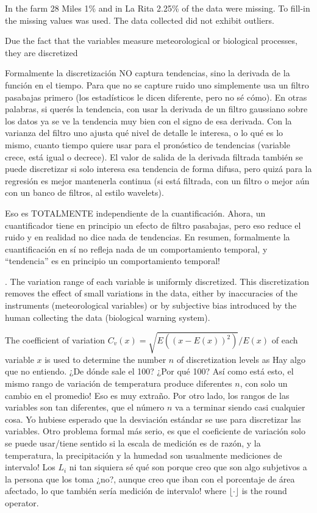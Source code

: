 In the farm 28 Miles 1\% and in La Rita 2.25\% of the data were missing.
%
To fill-in the missing values  was used.
%
The data collected did not exhibit outliers.

Due the fact that the variables measure meteorological or biological
processes, they are discretized %
%
{Formalmente la discretización NO captura tendencias, sino la derivada
  de la función en el tiempo.  Para que no se capture ruido uno
  simplemente usa un filtro pasabajas primero (los estadísticos le
  dicen diferente, pero no sé cómo).  En otras palabras, si querés la
  tendencia, con usar la derivada de un filtro gaussiano sobre los
  datos ya se ve la tendencia muy bien con el signo de esa derivada.
  Con la varianza del filtro uno ajusta qué nivel de detalle le
  interesa, o lo qué es lo mismo, cuanto tiempo quiere usar para el
  pronóstico de tendencias (variable crece, está igual o decrece).  El
  valor de salida de la derivada filtrada también se puede discretizar
  si solo interesa esa tendencia de forma difusa, pero quizá para la
  regresión es mejor mantenerla continua (si está filtrada, con un
  filtro o mejor aún con un banco de filtros, al estilo wavelets).

  Eso es TOTALMENTE independiente de la cuantificación.  Ahora, un
  cuantificador tiene en principio un efecto de filtro pasabajas, pero
  eso reduce el ruido y en realidad no dice nada de tendencias.  En
  resumen, formalmente la cuantificación en sí no refleja nada de un
  comportamiento temporal, y ``tendencia'' es en principio un
  comportamiento temporal!}.
%
The variation range of each variable is uniformly discretized.
%
This discretization removes the effect of small variations in the data,
either by inaccuracies of the instruments (meteorological variables)
or by subjective bias introduced by the human collecting the data
(biological warning system).

The coefficient of variation
$C_v(x)={\sqrt{E((x-E(x))^2)}}/{E(x)}$ of each variable $x$ is
used to determine the number $n$ of discretization levels as
%
%
{Hay algo que no entiendo.  ¿De dónde sale el 100?  ¿Por qué 100?
  Así como está esto, el mismo rango de variación de temperatura
  produce diferentes $n$, con solo un cambio en el promedio!  Eso es
  muy extraño.  Por otro lado, los rangos de las variables son tan
  diferentes, que el número $n$ va a terminar siendo casi cualquier
  cosa.  Yo hubiese esperado que la desviación estándar se use para
  discretizar las variables.  Otro problema formal más serio, es que
  el coeficiente de variación solo se puede usar/tiene sentido si la
  escala de medición es de razón, y la temperatura, la precipitación y
  la humedad son usualmente mediciones de intervalo! Los $L_i$ ni tan
  siquiera sé qué son porque creo que son algo subjetivos a la persona
  que los toma ¿no?, aunque creo que iban con el porcentaje de área
  afectado, lo que también sería medición de intervalo!}
%
where $\lfloor \cdot \rfloor$ is the round operator.


